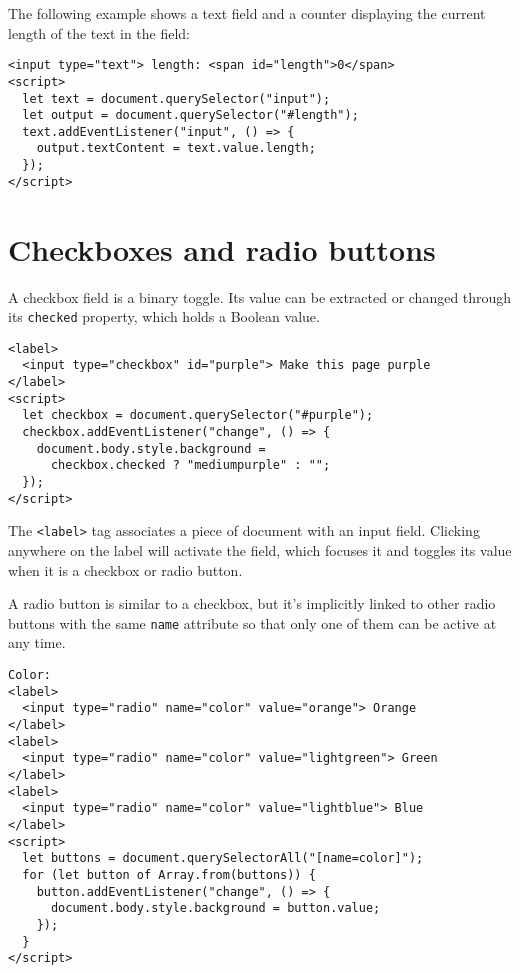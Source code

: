 The following example shows a text field and a counter displaying the current length of the text in the field:

\begin{lstlisting}
<input type="text"> length: <span id="length">0</span>
<script>
  let text = document.querySelector("input");
  let output = document.querySelector("#length");
  text.addEventListener("input", () => {
    output.textContent = text.value.length;
  });
</script>
\end{lstlisting}
\noindent

\section{Checkboxes and radio buttons}

A checkbox field is a binary toggle. Its value can be extracted or changed through its \lstinline`checked` property, which holds a Boolean value.

\begin{lstlisting}
<label>
  <input type="checkbox" id="purple"> Make this page purple
</label>
<script>
  let checkbox = document.querySelector("#purple");
  checkbox.addEventListener("change", () => {
    document.body.style.background =
      checkbox.checked ? "mediumpurple" : "";
  });
</script>
\end{lstlisting}
\noindent{}

The \lstinline`<label>` tag associates a piece of document with an input field. Clicking anywhere on the label will activate the field, which focuses it and toggles its value when it is a checkbox or radio button.

A radio button is similar to a checkbox, but it's implicitly linked to other radio buttons with the same \lstinline`name` attribute so that only one of them can be active at any time.

\begin{lstlisting}
Color:
<label>
  <input type="radio" name="color" value="orange"> Orange
</label>
<label>
  <input type="radio" name="color" value="lightgreen"> Green
</label>
<label>
  <input type="radio" name="color" value="lightblue"> Blue
</label>
<script>
  let buttons = document.querySelectorAll("[name=color]");
  for (let button of Array.from(buttons)) {
    button.addEventListener("change", () => {
      document.body.style.background = button.value;
    });
  }
</script>
\end{lstlisting}
\noindent{}

